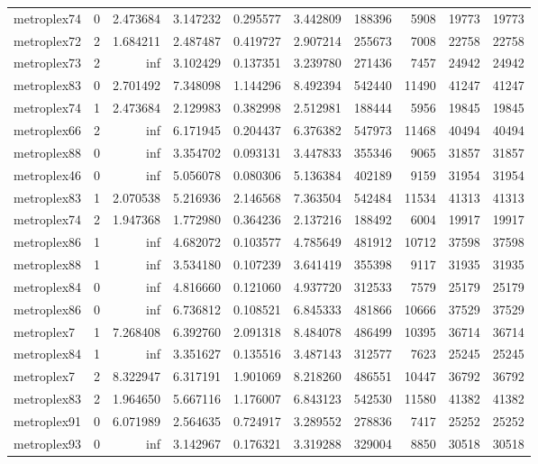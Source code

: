 \begin{longtable}{|l|r|r|r|r|r|r|r|r|r|}
metroplex74 & 0 & 2.473684 & 3.147232 & 0.295577 & 3.442809 & 188396 & 5908 & 19773 & 19773 \\
metroplex72 & 2 & 1.684211 & 2.487487 & 0.419727 & 2.907214 & 255673 & 7008 & 22758 & 22758 \\
metroplex73 & 2 & inf & 3.102429 & 0.137351 & 3.239780 & 271436 & 7457 & 24942 & 24942 \\
metroplex83 & 0 & 2.701492 & 7.348098 & 1.144296 & 8.492394 & 542440 & 11490 & 41247 & 41247 \\
metroplex74 & 1 & 2.473684 & 2.129983 & 0.382998 & 2.512981 & 188444 & 5956 & 19845 & 19845 \\
metroplex66 & 2 & inf & 6.171945 & 0.204437 & 6.376382 & 547973 & 11468 & 40494 & 40494 \\
metroplex88 & 0 & inf & 3.354702 & 0.093131 & 3.447833 & 355346 & 9065 & 31857 & 31857 \\
metroplex46 & 0 & inf & 5.056078 & 0.080306 & 5.136384 & 402189 & 9159 & 31954 & 31954 \\
metroplex83 & 1 & 2.070538 & 5.216936 & 2.146568 & 7.363504 & 542484 & 11534 & 41313 & 41313 \\
metroplex74 & 2 & 1.947368 & 1.772980 & 0.364236 & 2.137216 & 188492 & 6004 & 19917 & 19917 \\
metroplex86 & 1 & inf & 4.682072 & 0.103577 & 4.785649 & 481912 & 10712 & 37598 & 37598 \\
metroplex88 & 1 & inf & 3.534180 & 0.107239 & 3.641419 & 355398 & 9117 & 31935 & 31935 \\
metroplex84 & 0 & inf & 4.816660 & 0.121060 & 4.937720 & 312533 & 7579 & 25179 & 25179 \\
metroplex86 & 0 & inf & 6.736812 & 0.108521 & 6.845333 & 481866 & 10666 & 37529 & 37529 \\
metroplex7 & 1 & 7.268408 & 6.392760 & 2.091318 & 8.484078 & 486499 & 10395 & 36714 & 36714 \\
metroplex84 & 1 & inf & 3.351627 & 0.135516 & 3.487143 & 312577 & 7623 & 25245 & 25245 \\
metroplex7 & 2 & 8.322947 & 6.317191 & 1.901069 & 8.218260 & 486551 & 10447 & 36792 & 36792 \\
metroplex83 & 2 & 1.964650 & 5.667116 & 1.176007 & 6.843123 & 542530 & 11580 & 41382 & 41382 \\
metroplex91 & 0 & 6.071989 & 2.564635 & 0.724917 & 3.289552 & 278836 & 7417 & 25252 & 25252 \\
metroplex93 & 0 & inf & 3.142967 & 0.176321 & 3.319288 & 329004 & 8850 & 30518 & 30518 \\

\end{longtable}
